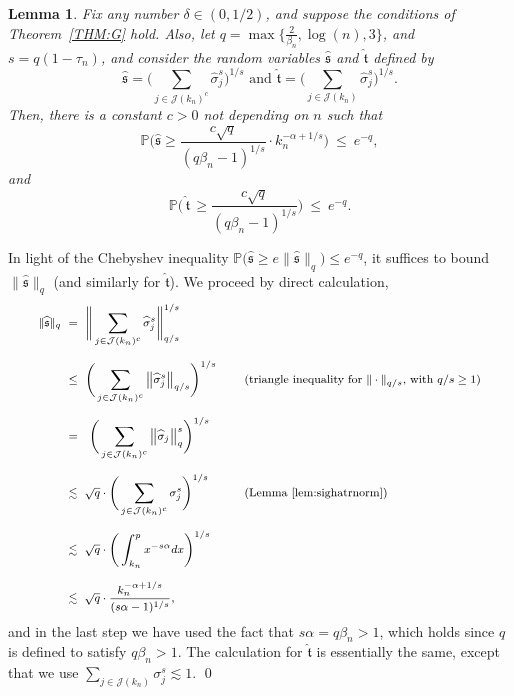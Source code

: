 \documentclass[aos,preprint]{imsart}
\numberwithin{equation}{section}
\theoremstyle{plain}
\newtheorem{lemma}{Lemma}[section]
\renewcommand{\hat}[1]{\widehat{#1}}
\newcommand{\J}{\mathcal{J}}
\renewcommand{\P}{\mathbb{P}}
\newcommand{\ts}{\textstyle}
\newcommand{\1}{{\bf{1}}}
\newcommand{\0}{\mathbf{0}}
\begin{document}
\begin{lemma}\label{lem:mathfrak}
Fix any number $\delta\in(0,1/2)$, and suppose the conditions of Theorem~\ref{THM:G} hold. Also, let $q=\max\{\frac{2}{\beta_n},\log(n),3\}$, and $s=q(1-\tau_n)$, and consider the random variables $\hat{\mathfrak{s}}$ and $\hat{\mathfrak{t}}$ defined by
$$\hat{\mathfrak{s}}=\Bigg(\sum_{j\in\J(k_n)^c} \hat\sigma_{j}^s\Bigg)^{1/s} \text{ \ \ \ \  and \ \ \ \ } \hat{\mathfrak{t}}=\Bigg(\sum_{j\in\J(k_n)} \hat\sigma_{j}^s\Bigg)^{1/s}.$$
Then,
there is a constant $c>0$ not depending on $n$ such that 
%
\begin{equation}
\P\Bigg(\hat{\mathfrak{s}}\geq \ts\frac{c\sqrt q}{(q\beta_n-1)^{1/s}}\cdot k_n^{-\alpha+1/s}\Bigg) \ \leq \  e^{-q},
\end{equation}
and
\begin{equation}\label{eqn:boundmathfrakt}
\P\Big(\, \hat{\mathfrak{t}}\, \geq \ts\frac{c \sqrt q}{(q\beta_n-1)^{1/s}}\Big) \ \leq \  e^{-q}.
\end{equation}
\end{lemma}
\proof 
%
In light of the Chebyshev inequality $\P\big(\hat{\mathfrak{s}}\geq e\|\hat{\mathfrak{s}}\|_q\big) \leq e^{-q}$, it suffices to bound $\|\hat{\mathfrak{s}}\|_q$ (and similarly for $\hat{\mathfrak{t}}$). We proceed by direct calculation,
\begin{equation*}
\footnotesize
\begin{split}
\|\hat{\mathfrak{s}}\|_q \ & = \ \Bigg\|\sum_{j\in\J(k_n)^c}\hat\sigma_{j}^s\Bigg\|_{q/s}^{1/s}\\[0.2cm]
%
&\leq \ \Bigg(\sum_{j\in\J(k_n)^c} \big\|\hat\sigma_{j}^s\big\|_{q/s}\Bigg)^{1/s} \ \ \ \ \ \ \ \text{(triangle inequality for $\|\cdot\|_{q/s}$, with $q/s\geq 1$)}\\[0.2cm]
%
&=\ \ \Bigg(\sum_{j\in\J(k_n)^c} \big\|\hat\sigma_{j}\big\|_q^s\Bigg)^{1/s}\\[0.2cm]
%
&\lesssim \ \sqrt{q} \cdot\Bigg( \sum_{j\in\J(k_n)^c} \sigma_j^{s}\Bigg)^{1/s} \ \ \ \ \ \ \ \ \ \text{(Lemma~\ref{lem:sighatrnorm})}\\[0.2cm]
%
%
&\lesssim \ \sqrt{q} \cdot \Bigg(\int_{k_n}^p x^{-s\alpha}dx\Bigg)^{1/s}  \\[0.2cm]
%
%
%
&\lesssim \ \sqrt{q}\cdot  \frac{k_n^{-\alpha+1/s}}{(s\alpha-1)^{1/s}},
%
\end{split}
\end{equation*}
\normalsize
and in the last step we have used the fact that $s\alpha=q\beta_n>1$, which holds since $q$ is defined to satisfy $q\beta_n>1$. The calculation for $\hat{\mathfrak{t}}$ is essentially the same, except that we use $\sum_{j\in\J(k_n)}\sigma_j^s\lesssim 1$.
\qed
~\\
\end{document}
